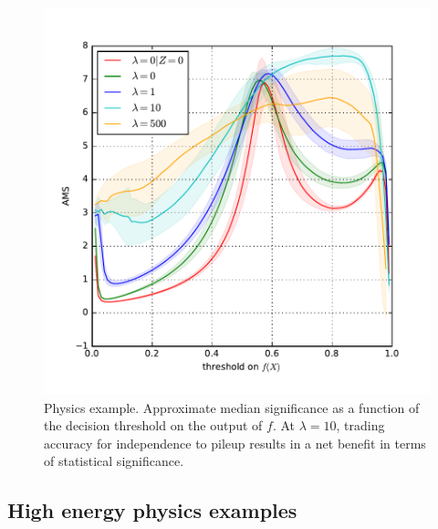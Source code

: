 \documentclass{article}
\theoremstyle{plain}
\begin{document}
\begin{figure}
\begin{minipage}{.46\linewidth}
        \includegraphics[width=\textwidth]{../figures/ams.pdf}\vspace{-1em}
        \caption{Physics example. Approximate median significance as a function of the decision threshold
                 on the output of $f$. At $\lambda=10$, trading
                 accuracy for independence to pileup
                 results in a net benefit in terms of statistical significance.}
        \label{fig:physics-ams}
\end{minipage}
\end{figure}

\subsection{High energy physics examples}
\label{sec:hep}
\end{document}
